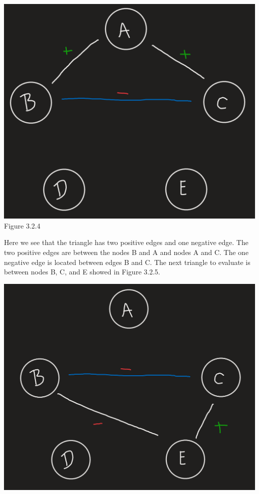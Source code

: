 \documentclass[11pt]{article}
\begin{document}
\begin{enumerate}
{\begin{center}
	\includegraphics[scale=0.5]{Figure_3_2_4}\\
	Figure 3.2.4\\
\end{center}
Here we see that the triangle has two positive edges and one negative edge.  The two positive edges are between the nodes B and A and nodes A and C.  The one negative edge is located between edges B and C.  The next triangle to evaluate is between nodes B, C, and E showed in Figure 3.2.5.
\begin{center}
	\includegraphics[scale=0.5]{Figure_3_2_5}\\

\end{center}}
\end{enumerate}
\end{document}
